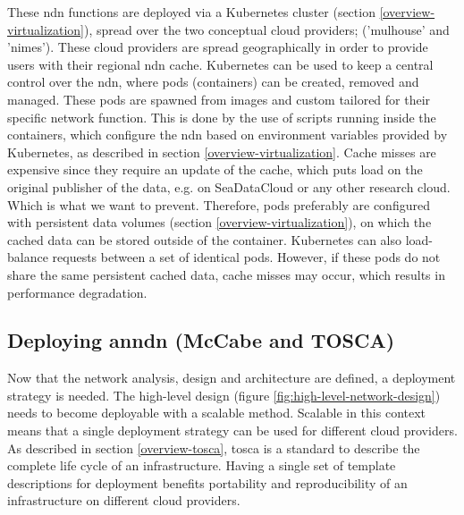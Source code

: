 
These \gls{ndn} functions are deployed via a Kubernetes cluster (section \ref{overview-virtualization}), spread over the two conceptual cloud providers; ('mulhouse' and 'nimes'). These cloud providers are spread geographically in order to provide users with their regional \gls{ndn} cache. Kubernetes can be used to keep a central control over the \gls{ndn}, where pods (containers) can be created, removed and managed. These pods are spawned from images and custom tailored for their specific network function. This is done by the use of scripts running inside the containers, which configure the \gls{ndn} based on environment variables provided by Kubernetes, as described in section \ref{overview-virtualization}. Cache misses are expensive since they require an update of the cache, which puts load on the original publisher of the data, e.g. on SeaDataCloud or any other research cloud. Which is what we want to prevent. Therefore, pods preferably are configured with persistent data volumes (section \ref{overview-virtualization}), on which the cached data can be stored outside of the container. Kubernetes can also load-balance requests between a set of identical pods. However, if these pods do not share the same persistent cached data, cache misses may occur, which results in performance degradation.

\subsection{Deploying an\gls{ndn} (McCabe and TOSCA)}
\label{planning-deploying}
Now that the network analysis, design and architecture are defined, a deployment strategy is needed. The high-level design (figure \ref{fig:high-level-network-design}) needs to become deployable with a scalable method. Scalable in this context means that a single deployment strategy can be used for different cloud providers. As described in section \ref{overview-tosca}, \gls{tosca} is a standard to describe the complete life cycle of an infrastructure. Having a single set of template descriptions for deployment benefits portability and reproducibility of an infrastructure on different cloud providers.

